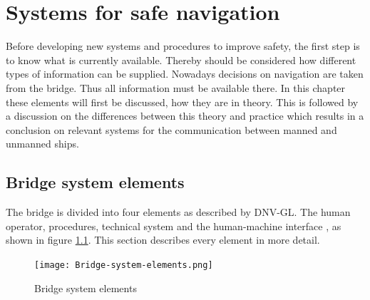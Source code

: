 \chapter{Systems for safe navigation}
\label{app:systems}
Before developing new systems and procedures to improve safety, the first step is to know what is currently available. Thereby should be considered how different types of information can be supplied. Nowadays decisions on navigation are taken from the bridge. Thus all information must be available there. In this chapter these elements will first be discussed, how they are in theory. This is followed by a discussion on the differences between this theory and practice which results in a conclusion on relevant systems for the communication between manned and unmanned ships.

\section{Bridge system elements}
The bridge is divided into four elements as described by DNV-GL. The human operator, procedures, technical system and the human-machine interface \cite{DNVGL2011}, as shown in figure \ref{fig:Bridge-system-elements}. This section describes every element in more detail.

\begin{figure}[H]
	\centering
	\texttt{[image: Bridge-system-elements.png]}
	\caption{Bridge system elements}
	\label{fig:Bridge-system-elements}
\end{figure}

